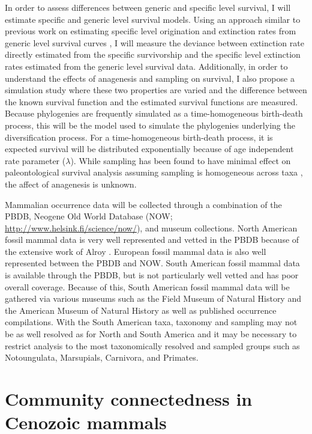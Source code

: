 \documentclass[12pt,letterpaper]{article}
\begin{document}
In order to assess differences between generic and specific level survival, I will estimate specific and generic level survival models. Using an approach similar to previous work on estimating specific level origination and extinction rates from generic level survival curves \citep{Foote1988}, I will measure the deviance between extinction rate directly estimated from the specific survivorship and the specific level extinction rates estimated from the generic level survival data. Additionally, in order to understand the effects of anagenesis and sampling on survival, I also propose a simulation study where these two properties are varied and the difference between the known survival function and the estimated survival functions are measured. Because phylogenies are frequently simulated as a time-homogeneous birth-death process, this will be the model used to simulate the phylogenies underlying the diversification process. For a time-homogeneous birth-death process, it is expected survival will be distributed exponentially because of age independent rate parameter (\(\lambda\)). While sampling has been found to have minimal effect on paleontological survival analysis assuming sampling is homogeneous across taxa \citep{Sepkoski1975}, the affect of anagenesis is unknown. 

Mammalian occurrence data will be collected through a combination of the PBDB, Neogene Old World Database (NOW; \url{http://www.helsink.fi/science/now/}), and museum collections. North American fossil mammal data is very well represented and vetted in the PBDB because of the extensive work of Alroy \citep{Alroy1996a,Alroy1998,Alroy2000g}. European fossil mammal data is also well represented between the PBDB and NOW. South American fossil mammal data is available through the PBDB, but is not particularly well vetted and has poor overall coverage. Because of this, South American fossil mammal data will be gathered via various museums such as the Field Museum of Natural History and the American Museum of Natural History as well as published occurrence compilations. With the South American taxa, taxonomy and sampling may not be as well resolved as for North and South America and it may be necessary to restrict analysis to the most taxonomically resolved and sampled groups such as Notoungulata, Marsupials, Carnivora, and Primates.


\section{Community connectedness in Cenozoic mammals}
\end{document}
